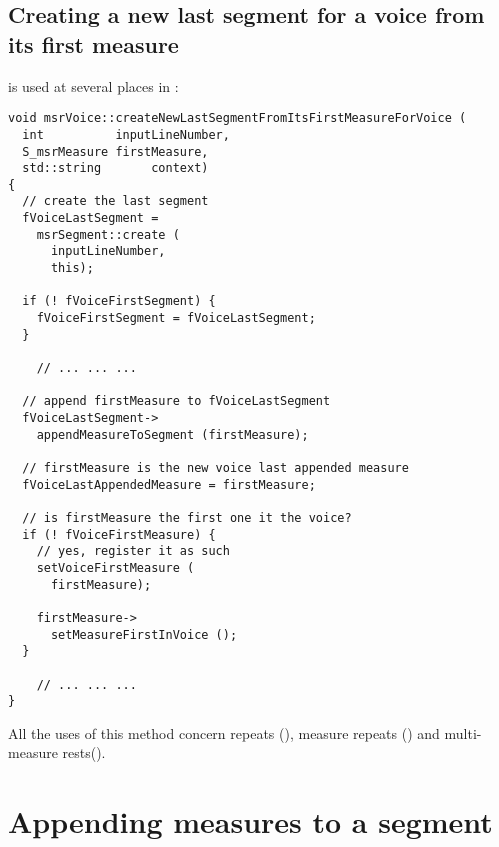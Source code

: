 \subsection{Creating a new last segment for a voice from its first measure}

 is used at several places in :
\begin{lstlisting}[language=CPlusPlus]
void msrVoice::createNewLastSegmentFromItsFirstMeasureForVoice (
  int          inputLineNumber,
  S_msrMeasure firstMeasure,
  std::string       context)
{
  // create the last segment
  fVoiceLastSegment =
    msrSegment::create (
      inputLineNumber,
      this);

  if (! fVoiceFirstSegment) {
    fVoiceFirstSegment = fVoiceLastSegment;
  }

	// ... ... ...

  // append firstMeasure to fVoiceLastSegment
  fVoiceLastSegment->
    appendMeasureToSegment (firstMeasure);

  // firstMeasure is the new voice last appended measure
  fVoiceLastAppendedMeasure = firstMeasure;

  // is firstMeasure the first one it the voice?
  if (! fVoiceFirstMeasure) {
    // yes, register it as such
    setVoiceFirstMeasure (
      firstMeasure);

    firstMeasure->
      setMeasureFirstInVoice ();
  }

	// ... ... ...
}
\end{lstlisting}

All the uses of this method concern repeats (), measure repeats () and multi-measure rests().


\section{Appending measures to a segment}

